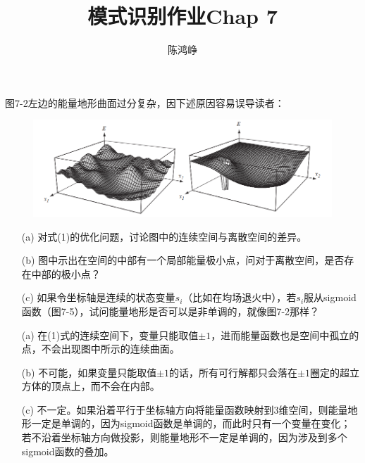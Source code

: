 \documentclass[reportComp]{thesis}
\title{模式识别作业Chap 7}
\author{陈鸿峥}
\begin{document}
\maketitle

\begin{question}[\textsection 7 Q3]
图7-2左边的能量地形曲面过分复杂，因下述原因容易误导读者：
\begin{figure}[H]
\centering
\includegraphics[width=0.8\linewidth]{fig/fig7-2.png}
\end{figure}
\begin{itemize}
	\item [(a)] 对式(1)的优化问题，讨论图中的连续空间与离散空间的差异。
	\item [(b)] 图中示出在空间的中部有一个局部能量极小点，问对于离散空间，是否存在中部的极小点？
	\item [(c)] 如果令坐标轴是连续的状态变量$s_i$（比如在均场退火中），若$s_i$服从sigmoid函数（图7-5），试问能量地形是否可以是非单调的，就像图7-2那样？
\end{itemize}
\end{question}
\begin{answer}
\begin{itemize}
	\item [(a)] 在(1)式的连续空间下，变量只能取值$\pm 1$，进而能量函数也是空间中孤立的点，不会出现图中所示的连续曲面。
	\item [(b)] 不可能，如果变量只能取值$\pm 1$的话，所有可行解都只会落在$\pm 1$圈定的超立方体的顶点上，而不会在内部。
	\item [(c)] 不一定。如果沿着平行于坐标轴方向将能量函数映射到3维空间，则能量地形一定是单调的，因为sigmoid函数是单调的，而此时只有一个变量在变化；若不沿着坐标轴方向做投影，则能量地形不一定是单调的，因为涉及到多个sigmoid函数的叠加。
\end{itemize}
\end{answer}
\end{document}
